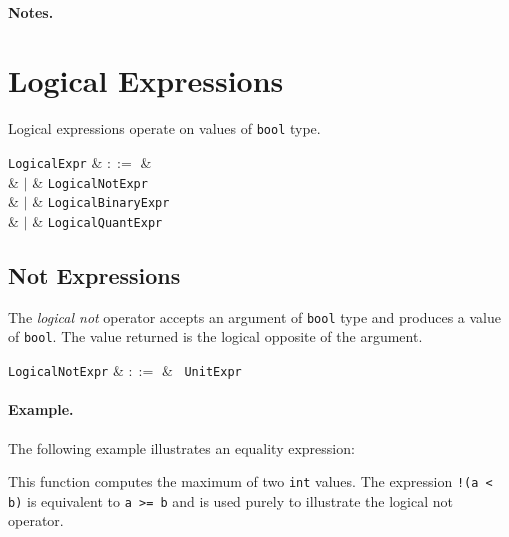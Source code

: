 \paragraph{Notes.}


\section{Logical Expressions}
\label{c_expr_logical}

Logical expressions operate on values of \lstinline{bool} type.

\begin{syntax}
  \verb+LogicalExpr+ & $::=$ &\\
  & $|$ & \verb+LogicalNotExpr+\\
  & $|$ & \verb+LogicalBinaryExpr+\\
  & $|$ & \verb+LogicalQuantExpr+\\
\end{syntax}



\subsection{Not Expressions}
\label{c_expr_logical_not}

The {\em logical not} operator accepts an argument of \lstinline{bool} type and produces a value of \lstinline{bool}.  The value returned is the logical opposite of the argument.  

\begin{syntax}
\verb+LogicalNotExpr+ & $::=$ & \token{!}\ \verb+UnitExpr+\\
\end{syntax}

\paragraph{Example.}

The following example illustrates an equality expression:



This function computes the maximum of two \lstinline{int} values.  The expression \lstinline{!(a < b)} is equivalent to \lstinline{a >= b} and is used purely to illustrate the logical not operator.

